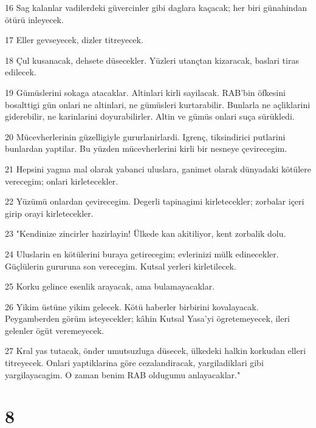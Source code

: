 \par 16 Sag kalanlar vadilerdeki güvercinler gibi daglara kaçacak; her biri günahindan ötürü inleyecek.
\par 17 Eller gevseyecek, dizler titreyecek.
\par 18 Çul kusanacak, dehsete düsecekler. Yüzleri utançtan kizaracak, baslari tiras edilecek.
\par 19 Gümüslerini sokaga atacaklar. Altinlari kirli sayilacak. RAB'bin öfkesini bosalttigi gün onlari ne altinlari, ne gümüsleri kurtarabilir. Bunlarla ne açliklarini giderebilir, ne karinlarini doyurabilirler. Altin ve gümüs onlari suça sürükledi.
\par 20 Mücevherlerinin güzelligiyle gururlanirlardi. Igrenç, tiksindirici putlarini bunlardan yaptilar. Bu yüzden mücevherlerini kirli bir nesneye çevirecegim.
\par 21 Hepsini yagma mal olarak yabanci uluslara, ganimet olarak dünyadaki kötülere verecegim; onlari kirletecekler.
\par 22 Yüzümü onlardan çevirecegim. Degerli tapinagimi kirletecekler; zorbalar içeri girip orayi kirletecekler.
\par 23 "Kendinize zincirler hazirlayin! Ülkede kan akitiliyor, kent zorbalik dolu.
\par 24 Uluslarin en kötülerini buraya getirecegim; evlerinizi mülk edinecekler. Güçlülerin gururuna son verecegim. Kutsal yerleri kirletilecek.
\par 25 Korku gelince esenlik arayacak, ama bulamayacaklar.
\par 26 Yikim üstüne yikim gelecek. Kötü haberler birbirini kovalayacak. Peygamberden görüm isteyecekler; kâhin Kutsal Yasa'yi ögretemeyecek, ileri gelenler ögüt veremeyecek.
\par 27 Kral yas tutacak, önder umutsuzluga düsecek, ülkedeki halkin korkudan elleri titreyecek. Onlari yaptiklarina göre cezalandiracak, yargiladiklari gibi yargilayacagim. O zaman benim RAB oldugumu anlayacaklar."

\chapter{8}

